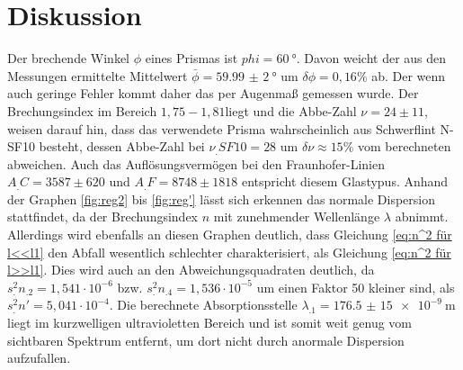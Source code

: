 
\section{Diskussion}
\label{sec:Diskussion}
Der brechende Winkel $\phi$ eines Prismas ist $phi=\SI{60}{\degree}$. Davon weicht der aus den Messungen ermittelte Mittelwert $\bar{\phi}=\SI{59,99(2)}{\degree}$ um $\delta\phi=0,16\%$ ab. Der wenn auch geringe Fehler kommt daher das per Augenmaß gemessen wurde. Der Brechungsindex im Bereich $1,75-1,81$liegt und die Abbe-Zahl $\nu=24\pm 11$, weisen darauf hin, dass das verwendete Prisma wahrscheinlich aus Schwerflint N-SF10 besteht, dessen Abbe-Zahl bei $\nu_.{SF10}=28$ um $\delta\nu\approx 15\%$ vom berechneten abweichen. Auch das Auflösungsvermögen bei den Fraunhofer-Linien $A_.C=3587\pm 620$ und $A_.F=8748\pm 1818$ entspricht diesem Glastypus.
Anhand der Graphen \ref{fig:reg2} bis \ref{fig:reg'} lässt sich erkennen das normale Dispersion stattfindet, da der Brechungsindex $n$ mit zunehmender Wellenlänge $\lambda$ abnimmt. Allerdings wird ebenfalls an diesen Graphen deutlich, dass Gleichung \eqref{eq:n^2 für l<<l1} den Abfall wesentlich schlechter charakterisiert, als Gleichung \eqref{eq:n^2 für l>>l1}. Dies wird auch an den Abweichungsquadraten deutlich, da
$s^2_.{n_.2}=1,541\cdot 10^{-6}$ bzw. $s^2_.{n_.4}=1,536\cdot 10^{-5}$ um einen Faktor 50 kleiner sind, als $s^2_.{n'}=5,041\cdot 10^{-4}$.
Die berechnete Absorptionsstelle $\lambda_.1=\SI{176,5(15)e-9}{\metre}$ liegt im kurzwelligen ultravioletten Bereich und ist somit weit genug vom sichtbaren Spektrum entfernt, um dort nicht durch anormale Dispersion aufzufallen.
